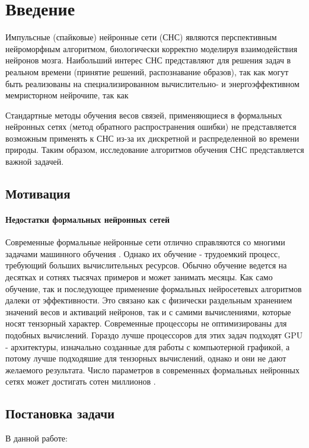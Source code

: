 \documentclass[a4paper]{article}
\begin{document}
\thispagestyle{empty}

\tableofcontents

\clearpage

\section{Введение}
Импульсные (спайковые) нейронные сети (СНС) являются перспективным нейроморфным алгоритмом, биологически корректно моделируя взаимодействия нейронов мозга. Наибольший интерес СНС представляют для решения задач в реальном времени (принятие решений, распознавание образов), так как могут быть реализованы на специализированном вычислительно- и энергоэффективном мемристорном нейрочипе, так как 

Стандартные методы обучения весов связей, применяющиеся в формальных нейронных сетях (метод обратного распространения ошибки) не представляется возможным применять к СНС из-за их дискретной и распределенной во времени природы. Таким образом, исследование алгоритмов обучения СНС представляется важной задачей.

\subsection{Мотивация}
\paragraph{Недостатки формальных нейронных сетей}
Современные формальные нейронные сети отлично справляются со многими задачами машинного обучения \cite{pmlr-v28-wan13}. Однако их обучение - трудоемкий процесс, требующий больших вычислительных ресурсов. Обычно обучение ведется на десятках и сотнях тысячах примеров и может занимать месяцы. Как само обучение, так и последующее применение формальных нейросетевых алгоритмов далеки от эффективности. Это связано как с физически раздельным хранением значений весов и активаций нейронов, так и с самими вычислениями, которые носят тензорный характер. Современные процессоры не оптимизированы для подобных вычислений. Гораздо лучше процессоров для этих задач подходят GPU - архитектуры, изначально созданные для работы с компьютерной графикой, а потому лучше подходяшие для тензорных вычислений, однако и они не дают желаемого результата. Число параметров в современных формальных нейронных сетях может достигать сотен миллионов \cite{ManyParams}.

\subsection{Постановка задачи}
В данной работе:
\end{document}
